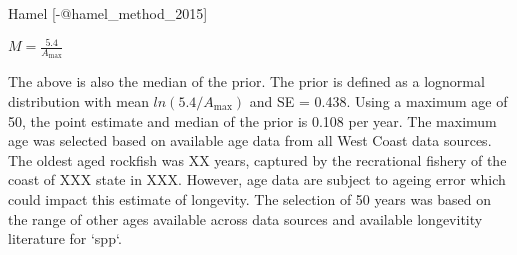 
Hamel [-@hamel_method_2015] 

\begin{centering}

$M=\frac{5.4}{A_{\text{max}}}$

\end{centering}

The above is also the median of the prior. The prior is defined as a lognormal distribution with mean $ln(5.4/A_{\text{max}})$ and SE = 0.438. Using a maximum age of 50, the point estimate and median of the prior is 0.108 per year.  The maximum age was selected based on available age data from all West Coast data sources.  The oldest aged rockfish was XX years, captured by the recrational fishery of the coast of XXX state in XXX.  However, age data are subject to ageing error which could impact this estimate of longevity.  The selection of 50 years was based on the range of other ages available across data sources and available longevitity literature for `spp`.
